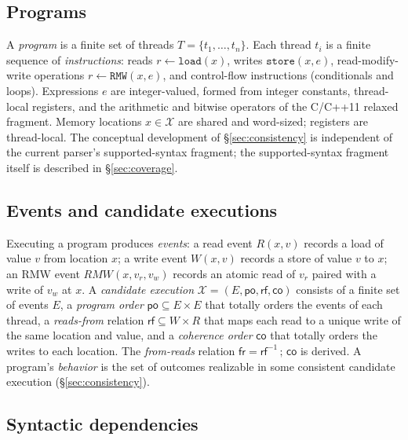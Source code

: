 \documentclass{llncs}
\newcommand{\rf}{\mathsf{rf}}
\newcommand{\co}{\mathsf{co}}
\newcommand{\fr}{\mathsf{fr}}
\newcommand{\po}{\mathsf{po}}
\begin{document}
\subsection{Programs}
\label{sec:programs-def}

A \emph{program} is a finite set of threads $T = \{t_1, \ldots, t_n\}$. Each
thread $t_i$ is a finite sequence of \emph{instructions}: reads
$r \leftarrow \mathtt{load}(x)$, writes $\mathtt{store}(x, e)$,
read-modify-write operations $r \leftarrow \mathtt{RMW}(x, e)$, and
control-flow instructions (conditionals and loops). Expressions $e$ are
integer-valued, formed from integer constants, thread-local registers, and the
arithmetic and bitwise operators of the C/C++11 relaxed fragment. Memory
locations $x \in \mathcal{X}$ are shared and word-sized; registers are
thread-local. The conceptual development of \S\ref{sec:consistency} is
independent of the current parser's supported-syntax fragment; the
supported-syntax fragment itself is described in \S\ref{sec:coverage}.

\subsection{Events and candidate executions}
\label{sec:executions}

Executing a program produces \emph{events}: a read event $R(x, v)$ records a
load of value $v$ from location $x$; a write event $W(x, v)$ records a store
of value $v$ to $x$; an RMW event $\mathit{RMW}(x, v_r, v_w)$ records an
atomic read of $v_r$ paired with a write of $v_w$ at $x$. A \emph{candidate
execution} $\mathcal{X} = (E, \po, \rf, \co)$ consists of a finite set of
events $E$, a \emph{program order} $\po \subseteq E \times E$ that totally
orders the events of each thread, a \emph{reads-from} relation $\rf \subseteq
W \times R$ that maps each read to a unique write of the same location and
value, and a \emph{coherence order} $\co$ that totally orders the writes to
each location. The \emph{from-reads} relation $\fr = \rf^{-1} \,;\, \co$ is
derived. A program's \emph{behavior} is the set of outcomes realizable in some
consistent candidate execution (\S\ref{sec:consistency}).

\subsection{Syntactic dependencies}
\label{sec:syndep}
\end{document}
